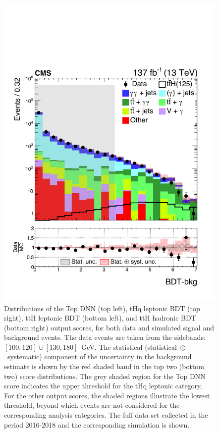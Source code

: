 \begin{figure}
  \includegraphics[width=.49\textwidth]{Figures/hgg_overview/ttHHadronic_MVA.pdf}
  \caption[Output scores of the discriminants used for the top-associated production mode categories]
  {
    Distributions of the Top DNN (top left), tHq leptonic BDT (top right), ttH leptonic BDT (bottom left), and  ttH hadronic BDT (bottom right) output scores, for both data and simulated signal and background events. The data events are taken from the \mgg sidebands: $[100,120]\cup[130,180]$~GeV. The statistical (statistical~$\oplus$~systematic) component of the uncertainty in the background estimate is shown by the red shaded band in the top two (bottom two) score distributions. The grey shaded region for the Top DNN score indicates the upper threshold for the tHq leptonic category. For the other output scores, the shaded regions illustrate the lowest threshold, beyond which events are not considered for the corresponding analysis categories. The full data set collected in the period 2016-2018 and the corresponding simulation is shown.
  }
  \label{fig:categorisation_top}
\end{figure}

